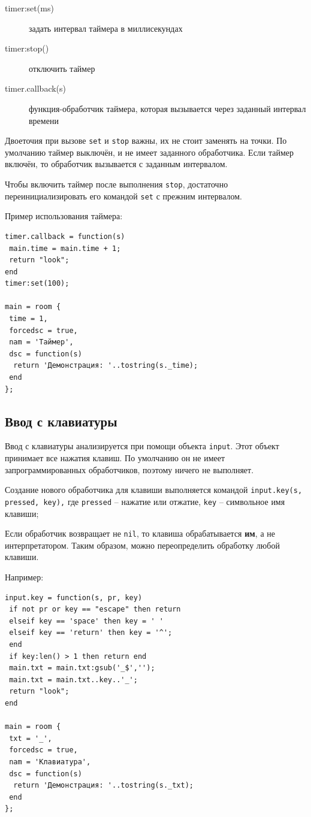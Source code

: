 \documentclass[a4paper,12pt]{article}
\begin{document}
\begin{description}
\item[timer:set(ms)] задать интервал таймера в миллисекундах
\item[timer:stop()] отключить таймер
\item[timer.callback(s)] функция-обработчик таймера, которая вызывается через заданный интервал времени
\end{description}

Двоеточия при вызове \verb/set/ и \verb/stop/ важны, их не стоит заменять на точки. По умолчанию таймер выключён, и не имеет заданного обработчика. Если таймер включён, то обработчик вызывается с заданным интервалом.

Чтобы включить таймер после выполнения \verb/stop/, достаточно переинициализировать его командой \verb/set/ с прежним интервалом.

Пример использования таймера:

\begin{verbatim}
timer.callback = function(s)
 main.time = main.time + 1;
 return "look";
end
timer:set(100);

main = room {
 time = 1,
 forcedsc = true,
 nam = 'Таймер',
 dsc = function(s)
  return 'Демонстрация: '..tostring(s._time);
 end
};
\end{verbatim}

\subsection{Ввод с клавиатуры}
\label{objects_input}
Ввод с клавиатуры анализируется при помощи объекта \verb/input/. Этот объект принимает все нажатия клавиш. По умолчанию он не имеет запрограммированных обработчиков, поэтому ничего не выполняет.

Создание нового обработчика для клавиши выполняется командой \verb/input.key(s, pressed, key),/ где \verb/pressed/ -- нажатие или отжатие, \verb/key/ -- символьное имя клавиши;

Если обработчик возвращает не \verb/nil/, то клавиша обрабатывается \textbf{им}, а не интерпретатором. Таким образом, можно переопределить обработку любой клавиши.

Например:

\begin{verbatim}
input.key = function(s, pr, key)
 if not pr or key == "escape" then return
 elseif key == 'space' then key = ' '
 elseif key == 'return' then key = '^';
 end
 if key:len() > 1 then return end
 main.txt = main.txt:gsub('_$','');
 main.txt = main.txt..key..'_';
 return "look";
end

main = room {
 txt = '_',
 forcedsc = true,
 nam = 'Клавиатура',
 dsc = function(s)
  return 'Демонстрация: '..tostring(s._txt);
 end
};
\end{verbatim}
\end{document}
